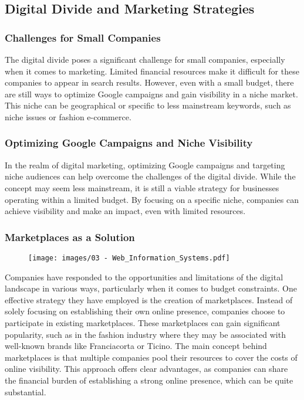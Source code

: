 \subsection{Digital Divide and Marketing
  Strategies}\label{digital-divide-and-marketing-strategies}

\subsubsection{Challenges for Small
  Companies}\label{challenges-for-small-companies}

The digital divide poses a significant challenge for small companies,
especially when it comes to marketing. Limited financial resources make
it difficult for these companies to appear in search results. However,
even with a small budget, there are still ways to optimize Google
campaigns and gain visibility in a niche market. This niche can be
geographical or specific to less mainstream keywords, such as niche
issues or fashion e-commerce.

\subsubsection{Optimizing Google Campaigns and Niche
  Visibility}\label{optimizing-google-campaigns-and-niche-visibility}

In the realm of digital marketing, optimizing Google campaigns and
targeting niche audiences can help overcome the challenges of the
digital divide. While the concept may seem less mainstream, it is still
a viable strategy for businesses operating within a limited budget. By
focusing on a specific niche, companies can achieve visibility and make
an impact, even with limited resources.

\subsubsection{Marketplaces as a
  Solution}\label{marketplaces-as-a-solution}

\begin{figure}[!h]
  \centering
  \texttt{[image: images/03 - Web\_Information\_Systems.pdf]}
\end{figure}


Companies have responded to the opportunities and limitations of the
digital landscape in various ways, particularly when it comes to budget
constraints. One effective strategy they have employed is the creation
of marketplaces. Instead of solely focusing on establishing their own
online presence, companies choose to participate in existing
marketplaces. These marketplaces can gain significant popularity, such
as in the fashion industry where they may be associated with well-known
brands like Franciacorta or Ticino. The main concept behind
marketplaces is that multiple companies pool their resources to cover
the costs of online visibility. This approach offers clear advantages,
as companies can share the financial burden of establishing a strong
online presence, which can be quite substantial.

